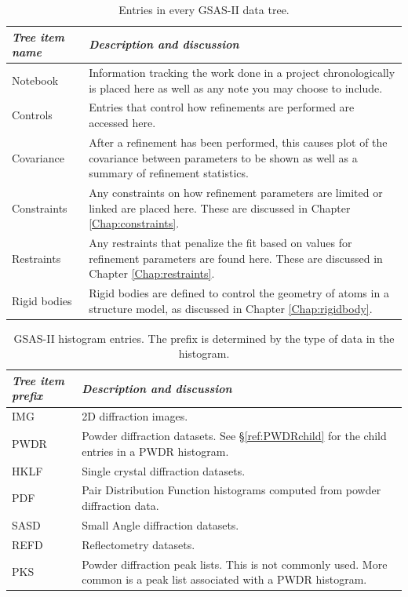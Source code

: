 \begin{table}
\centering
\caption{Entries in every GSAS-II data tree.}
\label{tab:UniversalTreeItems}
\begin{tabular}{| l | p{} |}
\hline
\textit{Tree item name} & \textit{Description and discussion} \\
\hline
Notebook & Information tracking the work done in a project chronologically is placed here as well as any note you may choose to include.\\
\hline
Controls & Entries that control how refinements are performed are accessed here.\\
\hline
Covariance & After a refinement has been performed, this causes plot of the covariance between parameters to be shown as well as a summary of refinement statistics.\\
\hline
Constraints & Any constraints on how refinement parameters are limited or linked are placed here. These are discussed in Chapter \ref{Chap:constraints}.\\
\hline
Restraints & Any restraints that penalize the fit based on values for refinement parameters are found here. These are discussed in Chapter \ref{Chap:restraints}.\\
\hline
Rigid bodies & Rigid bodies are defined to control the geometry of atoms in a structure model, as discussed in Chapter \ref{Chap:rigidbody}.\\
\hline
\end{tabular}
\end{table}

\begin{table}
\centering
\caption{GSAS-II histogram entries. The prefix is determined by the type of data in the histogram.}
\label{tab:HistItems}
\begin{tabular}{| l | p{} |}
\hline
\textit{Tree item prefix} & \textit{Description and discussion} \\
\hline
IMG & 2D diffraction images.\\
\hline
PWDR & Powder diffraction datasets. See \S\ref{ref:PWDRchild} for the child entries in a PWDR histogram.\\
\hline
HKLF & Single crystal diffraction datasets.\\
\hline
PDF & Pair Distribution Function histograms computed from powder diffraction data.\\
\hline
SASD & Small Angle diffraction datasets.\\
\hline
REFD & Reflectometry datasets.\\
\hline
PKS & Powder diffraction peak lists. This is not commonly used. More common is a peak list
associated with a PWDR histogram.\\
\hline
\end{tabular}
\end{table}

